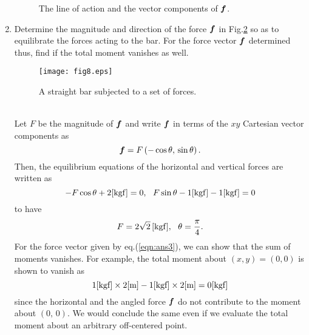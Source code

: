 \documentclass[10pt,a4j]{article}
\begin{document}
\begin{enumerate}
{\begin{figure}[h]
			\caption{The line of action and the vector components of $\mbox{\boldmath $f$}$.} 
		\label{fig:fig6_1}
		\end{figure}
	}
\item
	Determine the magnitude and direction of the force $\mbox{\boldmath $f$}$ in Fig.\ref{fig:fig8} 
	so as to equilibrate the forces acting to the bar. 
	For the force vector $\mbox{\boldmath $f$}$ determined thus, find if the total moment vanishes as well.
	\begin{figure}[h]
		\begin{center}
		\texttt{[image: fig8.eps]} 
		\end{center}
		\caption{A straight bar subjected to a set of forces.} 
		\label{fig:fig8}
	\end{figure}
	\\

	{\small
		Let $F$ be the magnitude of $\mbox{\boldmath $f$}$ and write $\mbox{\boldmath $f$}$ 
		in terms of the $xy$ Cartesian vector components as  
		\[
			\mbox{\boldmath $f$}=F \left( -\cos\theta,\, \sin\theta \right).
		\]
		Then, the equilibrium equations of the horizontal and vertical 
		forces are written as 
		\[
			-F\cos\theta + 2[{\rm kgf}]=0, \ \ 
			F\sin\theta -1[{\rm kgf}]-1[{\rm kgf}]=0
		\]
		to have 
		\begin{equation}
			F=2\sqrt{2} \,[{\rm kgf}], \ \ \theta=\frac{\pi}{4}.
			\label{eqn:ans3}
		\end{equation}
		For the force vector given by eq.(\ref{eqn:ans3}), we can show that
		the sum of moments vanishes.
		For example, the total moment about $(x,y)=(0,0)$ is shown to vanish as  
		\[
			{\rm 1[kgf] \times 2[m] -1[kgf] \times 2[m]=0 [kgf] }
		\]
		since the horizontal and the angled force $\mbox{\boldmath $f$}$ do not 
		contribute to the moment about $(0,\, 0)$. 
		We would conclude the same even if we evaluate the total moment 
		about an arbitrary off-centered point.
	}

\end{enumerate}
\end{document}
